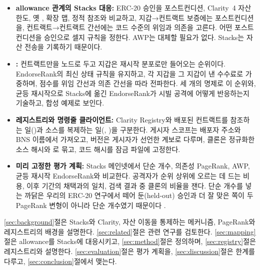 \begin{itemize}
\item \textbf{allowance 관계의 Stacks 대응:} ERC-20 승인을 포스트컨디션, Clarity~4 자산 한도, 옛 , 확장 맵, 정적 참조와 비교하고, 지갑→컨트랙트 보증에는 포스트컨디션을, 컨트랙트→컨트랙트 간선에는 코드 수준의 위임과 의존을 고른다. 어떤 포스트컨디션을 승인으로 셀지 규칙을 정한다. AWP는 대체할 필요가 없다. Stacks는 자산 전송을 기록하기 때문이다.
\item \textbf{\PCER:} 컨트랙트만을 노드로 두고 지갑은 재시작 분포로만 들어오는 순위이다. EndorseRank의 최신 상태 규칙을 유지하고, 각 지갑을 그 지갑이 낸 수수료로 가중하며, 점수를 위임 간선과 의존 간선을 따라 전파한다. 세 개의 명제로 이 순위와, 균등 재시작으로 Stacks에 옮긴 EndorseRank가 시빌 공격에 어떻게 반응하는지 기술하고, 합성 예제로 보인다.
\item \textbf{레지스트리와 명령줄 클라이언트:} Clarity Registry와  배포된 컨트랙트를 참조하는 일()과 소스를 복제하는 일(, )을 구분한다. 게시자 스코프는 배포자 주소와 BNS 이름에서 가져오고, 버전은 게시자가 선언한 계보로 다루며, 클론은 정규화한 소스 해시와 로 묶고, 코드 해시를 잠금 파일에 고정한다.
\item \textbf{미리 고정한 평가 계획:} Stacks 메인넷에서  단순 개수, 의존성 PageRank, AWP, 균등 재시작 EndorseRank와 비교한다. 공격자가 순위 상위에 오르는 데 드는 비용, 이후 기간의 채택과의 일치, 검색 결과 중 클론의 비율을 잰다. 단순 개수를 넣는 까닭은 우리의 ERC-20 연구에서 떼어 둔(held-out) 승인과 더 잘 맞은 쪽이 두 PageRank 변형이 아니라 단순 개수였기 때문이다 \cite{kwon2026endorserank}.
\end{itemize}

\ref{sec:background}절은 Stacks와 Clarity, 자산 이동을 통제하는 메커니즘, PageRank와 레지스트리의 배경을 설명한다. \ref{sec:related}절은 관련 연구를 검토한다. \ref{sec:mapping}절은 allowance를 Stacks에 대응시키고, \ref{sec:method}절은  정의하며, \ref{sec:registry}절은 레지스트리와  설명한다. \ref{sec:evaluation}절은 평가 계획을, \ref{sec:discussion}절은 한계를 다루고, \ref{sec:conclusion}절에서 맺는다.

